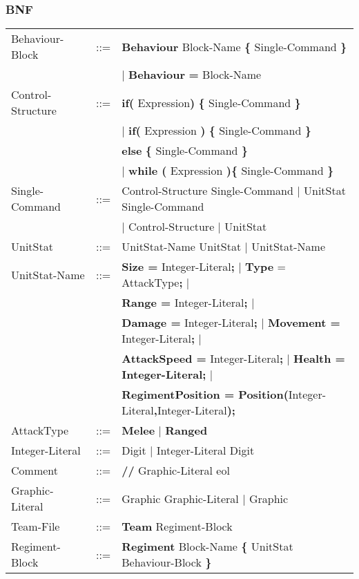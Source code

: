 	\subsubsection{BNF}
		\begin{tabular}{ l l l }
			Behaviour-Block	   &	::=	 & {\bf Behaviour} Block-Name {\bf \{} Single-Command {\bf \}}  \\
							   &         & $\mid$ {\bf Behaviour} {\bf = } Block-Name \\
			Control-Structure  &  	::=  & {\bf if( } Expression{\bf )} {\bf \{ } Single-Command {\bf \} }  \\
							   &		 & $\mid$ {\bf if(} Expression {\bf )} {\bf \{ }Single-Command {\bf \}} \\
							   &   		 & {\bf else } {\bf \{ }Single-Command {\bf \} } \\					   
							   &   		 & $\mid$ {\bf while (} Expression {\bf )}{\bf \{ } Single-Command {\bf \}} \\
			Single-Command     &	::=  & Control-Structure Single-Command $\mid$ UnitStat Single-Command \\
							   &		 & $\mid$ Control-Structure $\mid$ UnitStat					\\
			UnitStat		   &	::=  & UnitStat-Name UnitStat $\mid$ UnitStat-Name \\
			UnitStat-Name	   &	::=	 & {\bf Size =} Integer-Literal{\bf ;} $\mid$ {\bf Type} = AttackType{\bf ;} $\mid$ \\
							   &	     & {\bf  Range =} Integer-Literal{\bf;} $\mid$ \\
							   &	     & {\bf Damage =} Integer-Literal{\bf ;} $\mid$ {\bf Movement = }Integer-Literal{\bf ;} $\mid$ \\
							   &		 & {\bf AttackSpeed = }Integer-Literal{\bf ;} $\mid$ {\bf Health  = Integer-Literal;} $\mid$ \\
							   &		 & {\bf RegimentPosition = Position(}Integer-Literal{\bf ,}Integer-Literal{\bf );} \\
			AttackType		   &    ::=  & {\bf Melee} $\mid$ {\bf Ranged} \\
			Integer-Literal    &	::=  & Digit $\mid$ Integer-Literal Digit \\
			Comment			   &	::=	 & {\bf //} Graphic-Literal eol \\
			Graphic-Literal	   &	::=	 & Graphic Graphic-Literal $\mid$ Graphic \\
			Team-File		   &	::=	 & {\bf Team} Regiment-Block \\
			Regiment-Block     &	::=	 & {\bf Regiment} Block-Name {\bf \{ } UnitStat Behaviour-Block \bf{\} }\\

\end{tabular}

